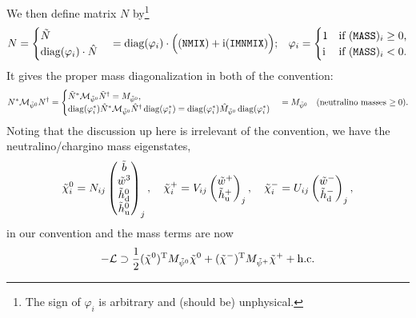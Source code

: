 \documentclass[CheatSheet]{subfiles}
\begin{document}
We then define matrix $N$ by\footnote{The sign of $\varphi_i$ is arbitrary and (should be) unphysical.}
\begin{align}
 &N = \begin{cases}
  \tilde N\\
  \operatorname{\mathrm{diag}}(\varphi_i) \cdot \hat N
  \end{cases}
   = \operatorname{\mathrm{diag}}(\varphi_i) \cdot\Bigl(\text{(\texttt{NMIX})} + \mathrm{i}\text{(\texttt{IMNMIX})}\Bigr);
  &\varphi_i = \begin{cases}
 1 & \text{if (\texttt{MASS})$_i\ge0$,}\\
 \mathrm{i} & \text{if (\texttt{MASS})$_i<0$.}
             \end{cases}
\end{align}
It gives the proper mass diagonalization in both of the  convention:
\begin{equation}
 N^*\mathcal M_{\tilde\psi^0}N^\dagger
=
\begin{cases}
 \tilde N^*\mathcal M_{\tilde\psi^0}\tilde N^\dagger = M_{\tilde\psi^0},\\
 \operatorname{\mathrm{diag}}(\varphi_i^*)\hat N^* \mathcal M_{\tilde\psi^0}\hat N^{\dagger}\operatorname{\mathrm{diag}}(\varphi_i^*)
 = 
 \operatorname{\mathrm{diag}}(\varphi_i^*)\hat M_{\tilde\psi^0}\operatorname{\mathrm{diag}}(\varphi_i^*)
\end{cases}
 = M_{\tilde\psi^0}
 \quad\text{(neutralino masses $\ge 0$)}.
\end{equation}
Noting that the discussion up here is irrelevant of the convention, we have the neutralino/chargino mass eigenstates,
\begin{equation}
 \neut[i] = N_{ij} \pmat{\tib\\\tiw^3\\\thdz\\\thuz}_j,
\quad
 \charP[i] = V_{ij} \pmat{\tiw^+\\\thup}_j,
\quad
 \charM[i] = U_{ij} \pmat{\tiw^-\\\thdm}_j,
\end{equation}
in our convention and the mass terms are now
\begin{equation}
  -\mathcal L\supset
\frac12(\neut)^\TT M_{\tilde\psi^0} \neut
+ (\charM)^\TT M_{\tilde\psi^+}\charP + \text{h.c.}
\end{equation}
\end{document}
